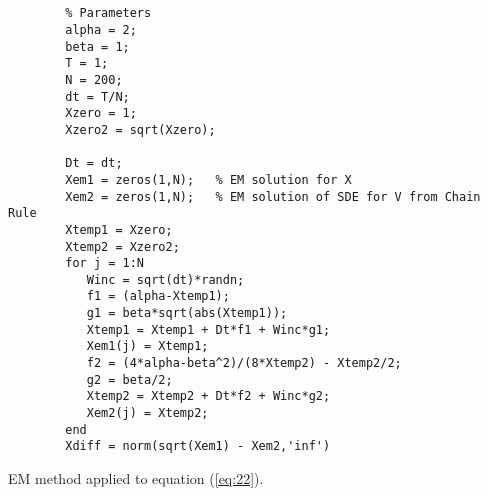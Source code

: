 \documentclass[12pt,a4paper]{article}
\def\refer #1\par{\noindent\hangindent=\parindent\hangafter=1 #1\par}
\begin{document}
\begin{program}
\begin{scriptsize}
				\begin{verbatim}
				
				
        % Parameters
        alpha = 2; 
        beta = 1; 
        T = 1; 
        N = 200; 
        dt = T/N;  
        Xzero = 1; 
        Xzero2 = sqrt(Xzero);               

        Dt = dt;                                        
        Xem1 = zeros(1,N);   % EM solution for X
        Xem2 = zeros(1,N);   % EM solution of SDE for V from Chain Rule       
        Xtemp1 = Xzero; 
        Xtemp2 = Xzero2;
        for j = 1:N
           Winc = sqrt(dt)*randn;  
           f1 = (alpha-Xtemp1);
           g1 = beta*sqrt(abs(Xtemp1));
           Xtemp1 = Xtemp1 + Dt*f1 + Winc*g1;
           Xem1(j) = Xtemp1;
           f2 = (4*alpha-beta^2)/(8*Xtemp2) - Xtemp2/2;
           g2 = beta/2;
           Xtemp2 = Xtemp2 + Dt*f2 + Winc*g2;
           Xem2(j) = Xtemp2;
        end
        Xdiff = norm(sqrt(Xem1) - Xem2,'inf')
       \end{verbatim}
\end{scriptsize}
 \caption{EM method applied to equation (\ref{eq:22}).}
\end{program}


 \noindent
 \refer{Cochrane, J.H.: \textit{Asset Pricing}.
 Princeton University Press, NJ, (2005) }
\end{document}

